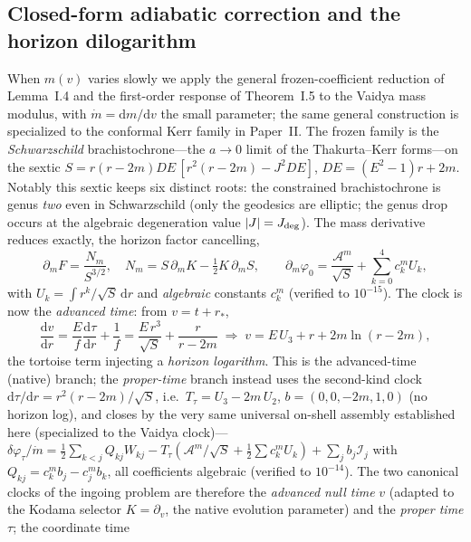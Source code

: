 \documentclass[12pt]{iopart}
\newcommand{\dd}{\mathrm{d}}
\begin{document}
\subsection{Closed-form adiabatic correction and the horizon dilogarithm}
\label{sec:vaidya-adiabatic}
When $m(v)$ varies slowly we apply the general frozen-coefficient reduction of
Lemma~I.4 and the first-order response of Theorem~I.5 to the Vaidya mass modulus, with
$\dot m=\dd m/\dd v$ the small parameter; the same general construction is specialized to
the conformal Kerr family in Paper~II. The frozen family
is the \emph{Schwarzschild} brachistochrone---the $a\to0$ limit of the
Thakurta--Kerr forms---on the sextic
$S=r(r-2m)DE\,[r^2(r-2m)-J^2 DE]$, $DE=(E^2-1)r+2m$. Notably this sextic keeps six
distinct roots: the constrained brachistochrone is genus \emph{two} even in
Schwarzschild (only the geodesics are elliptic; the genus drop occurs at the algebraic
degeneration value $|J|=J_{\rm deg}$). The mass derivative reduces exactly, the horizon factor cancelling,
\begin{equation}
    \partial_m F=\frac{N_m}{S^{3/2}},\quad N_m=S\,\partial_m K-\tfrac12 K\,\partial_m S,
    \qquad
    \partial_m\varphi_0=\frac{\mathcal{A}^m}{\sqrt S}+\sum_{k=0}^4 c_k^m U_k,
    \label{eq:dm-reduction}
\end{equation}
with $U_k=\int r^k/\sqrt S\,\dd r$ and \emph{algebraic} constants $c_k^m$ (verified
to $10^{-15}$). The clock is now the \emph{advanced time}: from $v=t+r_*$,
\begin{equation}
    \frac{\dd v}{\dd r}=\frac{E}{f}\frac{\dd\tau}{\dd r}+\frac1f
    =\frac{E\,r^3}{\sqrt S}+\frac{r}{r-2m}
    \;\Rightarrow\;
    v=E\,U_3+r+2m\ln(r-2m),
    \label{eq:vaidya-clock}
\end{equation}
the tortoise term injecting a \emph{horizon logarithm}. This is the advanced-time
(native) branch; the \emph{proper-time} branch instead uses the second-kind clock
$\dd\tau/\dd r=r^2(r-2m)/\sqrt S$, i.e.\ $T_\tau=U_3-2m\,U_2$, $b=(0,0,-2m,1,0)$ (no
horizon log), and closes by the very same
universal on-shell assembly established here (specialized to the Vaidya clock)---$\delta\varphi_\tau/\dot m=\tfrac12\sum_{k<j}Q_{kj}
W_{kj}-T_\tau(\mathcal{A}^m/\sqrt S+\tfrac12\sum c_k^m U_k)+\sum_j b_j\mathcal{I}_j$ with
$Q_{kj}=c_k^m b_j-c_j^m b_k$, all coefficients algebraic (verified to
$10^{-14}$). The two canonical clocks of the ingoing problem are therefore the
\emph{advanced null time} $v$ (adapted to the Kodama selector $K=\partial_v$, the
native evolution parameter) and the \emph{proper time} $\tau$; the coordinate time
\end{document}
